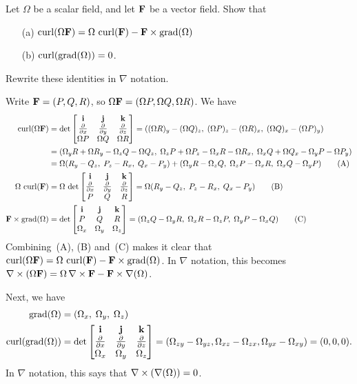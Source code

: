 \documentclass[a4paper]{amsart}
\renewenvironment{solution}{\SolutionInline}{\endSolutionInline}
\begin{document}
\begin{exercise}
 Let $\Omega$ be a scalar field, and let $\mathbf{F}$ be a vector field.
 Show that 
 \begin{itemize}
  \item[(a)] $\operatorname{curl}(\Omega\mathbf{F})=\Omega\,\operatorname{curl}(\mathbf{F})-\mathbf{F}\times\operatorname{grad}(\Omega)$
  \item[(b)] $\operatorname{curl}(\operatorname{grad}(\Omega))=0$.
 \end{itemize}
 Rewrite these identities in $\nabla$ notation.
\end{exercise}
\begin{solution}
 Write $\mathbf{F}=(P,Q,R)$, so $\Omega\mathbf{F}=(\Omega P,\Omega Q,\Omega R)$.  We
 have 
 \begin{align*}
  \operatorname{curl}(\Omega\mathbf{F})
   &= 
   \det\left[\begin{matrix} \mathbf{i} & \mathbf{j} & \mathbf{k} \\
    \frac{\partial}{\partial x} & \frac{\partial}{\partial y} & \frac{\partial}{\partial z} \\
    \Omega P & \Omega Q & \Omega R
   \end{matrix}\right]
   = ((\Omega R)_y-(\Omega Q)_z,\;
      (\Omega P)_z-(\Omega R)_x,\;
      (\Omega Q)_x-(\Omega P)_y) \\
   &= (\Omega_y R + \Omega R_y - \Omega_z Q - \Omega Q_z,\;
       \Omega_z P + \Omega P_z - \Omega_x R - \Omega R_x,\;
       \Omega_x Q + \Omega Q_x - \Omega_y P - \Omega P_y) \\
   &= \Omega(R_y-Q_z,\; P_z-R_x,\; Q_x-P_y) +
      (\Omega_y R - \Omega_z Q,\;
       \Omega_z P - \Omega_x R,\;
       \Omega_x Q - \Omega_y P) \tag{A} \\
   \Omega\,\operatorname{curl}(\mathbf{F}) &= 
    \Omega\,\det\left[\begin{matrix} \mathbf{i} & \mathbf{j} & \mathbf{k} \\
     \frac{\partial}{\partial x} & \frac{\partial}{\partial y} & \frac{\partial}{\partial z} \\
     P & Q & R \end{matrix}\right] =
     \Omega(R_y-Q_z,\;P_z-R_x,\;Q_x-P_y) \tag{B}\\
   \mathbf{F}\times\operatorname{grad}(\Omega) &= 
    \det\left[\begin{matrix}
     \mathbf{i}      & \mathbf{j}      & \mathbf{k}  \\
     P        & Q        & R    \\
     \Omega_x & \Omega_y & \Omega_z
    \end{matrix}\right] 
     = (\Omega_z Q-\Omega_y R,\;
        \Omega_x R-\Omega_z P,\;
        \Omega_y P-\Omega_x Q) \tag{C}
 \end{align*}
 Combining~(A), (B) and~(C) makes it clear that 
 $\operatorname{curl}(\Omega\mathbf{F})=\Omega\,\operatorname{curl}(\mathbf{F})-\mathbf{F}\times\operatorname{grad}(\Omega)$.  In
 $\nabla$ notation, this becomes
 $\nabla\times(\Omega\mathbf{F})=\Omega\,\nabla\times\mathbf{F}-\mathbf{F}\times\nabla(\Omega)$.

 Next, we have
 \begin{align*}
  \operatorname{grad}(\Omega) &= (\Omega_x,\;\Omega_y,\;\Omega_z) \\
  \operatorname{curl}(\operatorname{grad}(\Omega)) &= 
   \det\left[\begin{matrix} 
    \mathbf{i}      & \mathbf{j}      & \mathbf{k}  \\
    \frac{\partial}{\partial x}     & \frac{\partial}{\partial y}     & \frac{\partial}{\partial z} \\
    \Omega_x & \Omega_y & \Omega_z
   \end{matrix}\right] 
   = (\Omega_{zy} - \Omega_{yz},
      \Omega_{xz} - \Omega_{zx},
      \Omega_{yx} - \Omega_{xy}) 
   = (0,0,0).
 \end{align*}
 In $\nabla$ notation, this says that $\nabla\times(\nabla(\Omega))=0$.
\end{solution}
\end{document}
